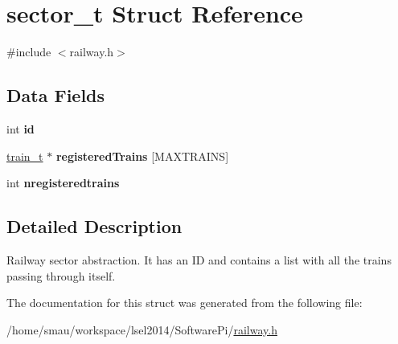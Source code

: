 \hypertarget{structsector__t}{\section{sector\-\_\-t Struct Reference}
\label{structsector__t}
}


{\ttfamily \#include $<$railway.\-h$>$}

\subsection*{Data Fields}
\begin{DoxyCompactItemize}
\item 
\hypertarget{structsector__t_a5a97661a7508857f0da6fc5366532c4a}{int {\bfseries id}}\label{structsector__t_a5a97661a7508857f0da6fc5366532c4a}

\item 
\hypertarget{structsector__t_ada50f819a6c99708c35069bc218fccc6}{\hyperlink{structtrain__t}{train\-\_\-t} $\ast$ {\bfseries registered\-Trains} \mbox{[}M\-A\-X\-T\-R\-A\-I\-N\-S\mbox{]}}\label{structsector__t_ada50f819a6c99708c35069bc218fccc6}

\item 
\hypertarget{structsector__t_a48d46e0b1f84a3fbc9568cdb919b0a1e}{int {\bfseries nregisteredtrains}}\label{structsector__t_a48d46e0b1f84a3fbc9568cdb919b0a1e}

\end{DoxyCompactItemize}


\subsection{Detailed Description}
Railway sector abstraction. It has an I\-D and contains a list with all the trains passing through itself. 

The documentation for this struct was generated from the following file\-:\begin{DoxyCompactItemize}
\item 
/home/smau/workspace/lsel2014/\-Software\-Pi/\hyperlink{railway_8h}{railway.\-h}\end{DoxyCompactItemize}
